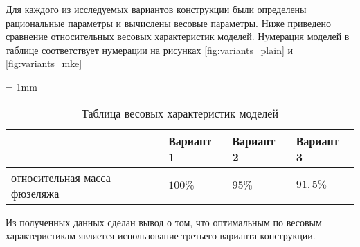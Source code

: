 Для каждого из исследуемых вариантов конструкции были определены рациональные параметры и вычислены весовые параметры. Ниже приведено сравнение относительных весовых характеристик моделей. Нумерация моделей в таблице соответствует нумерации на рисунках \ref{fig:variants_plain} и \ref{fig:variants_mke}

\tabulinesep = 1mm
\begin{table}[H]
\captionsetup{justification=centering}
\caption{Таблица весовых характеристик моделей}
\begin{tabu}to 
\hline
{}
 & Вариант 1 & Вариант 2 & Вариант 3 \\ \hline
относительная масса фюзеляжа & $100\%$ & $95\%$ & $91,5\%$ \\ \hline
\end{tabu}
\label{tab:variantsMasses}
\end{table}

Из полученных данных сделан вывод о том, что оптимальным по весовым характеристикам является использование третьего варианта конструкции.  

